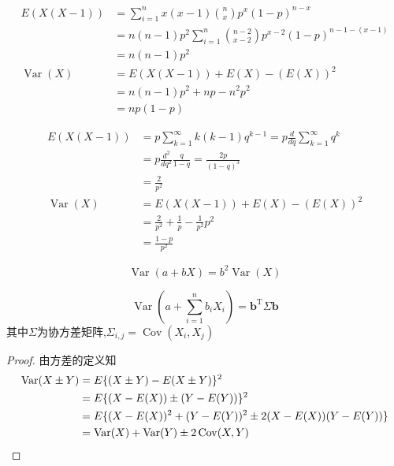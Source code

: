 \begin{example}[凑一法求解二项分布的方差]\label{ex:binom_dist_var}
    \begin{align*}
        E(X(X-1))             & =\sum_{i=1}^n x(x-1) \binom{n}{x} p^x(1-p)^{n-x}                   \\
                              & = n(n-1)p^2 \sum_{i=1}^n \binom{n-2}{x-2} p^{x-2}(1-p)^{n-1-(x-1)} \\
                              & =n(n-1)p^2                                                         \\
        \operatorname{Var}(X) & =  E(X(X-1)) + E(X) -(E(X))^2                                      \\
                              & = n(n-1)p^2 + np -n^2 p^2                                          \\
                              & =np(1-p)
    \end{align*}
\end{example}

\begin{example}[微分法求解几何分布方差]\label{ex:geometric_dist_var}
    \begin{align*}
        E(X(X-1))             & =p\sum_{k=1}^{\infty}k(k-1) q^{k-1}=p\frac{d}{d q}\sum_{k=1}^{\infty} q^{k} \\
                              & =p\frac{d^2}{d q^2} \frac{q}{1-q} =\frac{2p}{(1-q)^{3}}                     \\
                              & =\frac{2}{p^2}                                                              \\
        \operatorname{Var}(X) & =  E(X(X-1)) + E(X) -(E(X))^2                                               \\
                              & = \frac{2}{p^2} + \frac{1}{p} -\frac{1}{p^2} p^2                            \\
                              & = \frac{1-p}{p^2}
    \end{align*}
\end{example}

\begin{proposition}
    \[ \operatorname{Var}(a+bX)=b^2\operatorname{Var}(X) \]
\end{proposition}

\begin{proposition}
    \[ \operatorname{Var}(a+\sum_{i=1}^n b_i X_i)=\mathbf{b}^{\mathrm{T}} \Sigma \mathbf{b}\]
    其中$\Sigma$为协方差矩阵,$\Sigma_{i,j}=\operatorname{Cov}(X_i,X_j)$
\end{proposition}
\begin{proof}
    由方差的定义知
    \begin{align*}
        \operatorname{Var}(X \pm Y) & =E\{(X \pm Y)-E(X \pm Y)\}^2                      \\
                      & =E\{(X-E(X)) \pm(Y-E(Y))\}^2                      \\
                      & =E\{(X-E(X))^2+(Y-E(Y))^2 \pm 2(X-E(X))(Y-E(Y))\} \\
                      & =\operatorname{Var}(X)+\operatorname{Var}(Y) \pm 2 \operatorname{Cov}(X, Y)
    \end{align*}
\end{proof}

